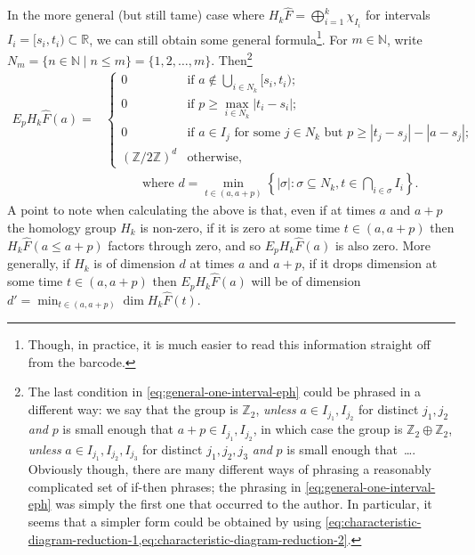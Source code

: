 \documentclass[12pt]{article}
\numberwithin{equation}{subsection}
\numberwithin{theorem}{subsection}
\numberwithin{lemma}{subsection}
\numberwithin{corollary}{subsection}
\numberwithin{definition}{subsection}
\numberwithin{example}{subsection}
\numberwithin{note}{subsection}
\newcommand{\zz}{\mathbb{Z}}
\newcommand{\rr}{\mathbb{R}}
\newcommand{\nn}{\mathbb{N}}
\begin{document}
            In the more general (but still tame) case where $H_k\widehat{F}=\bigoplus_{i=1}^k\chi_{I_i}$ for intervals $I_i=[s_i,t_i)\subset\rr$, we can still obtain some general formula\footnote{
                Though, in practice, it is much easier to read this information straight off from the barcode.
            }.
            For $m\in\nn$, write $N_m=\{n\in\nn \mid n\leqslant m\}=\{1,2,\ldots,m\}$.
            Then\footnote{
                The last condition in \cref{eq:general-one-interval-eph} could be phrased in a different way: we say that the group is $\zz_2$, \emph{unless} $a\in I_{j_1},I_{j_2}$ for distinct $j_1,j_2$ \emph{and} $p$ is small enough that $a+p\in I_{j_1},I_{j_2}$, in which case the group is $\zz_2\oplus\zz_2$, \emph{unless} $a\in I_{j_1},I_{j_2},I_{j_3}$ for distinct $j_1,j_2,j_3$ \emph{and} $p$ is small enough that~\ldots.
                Obviously though, there are many different ways of phrasing a reasonably complicated set of if-then phrases; the phrasing in \cref{eq:general-one-interval-eph} was simply the first one that occurred to the author.
                In particular, it seems that a simpler form could be obtained by using \cref{eq:characteristic-diagram-reduction-1,eq:characteristic-diagram-reduction-2}.
            }
            \begin{align}
                E_pH_k\widehat{F}(a)=
                &\begin{cases}
                    0 &\mbox{if }a\not\in\bigcup_{i\in N_k}[s_i,t_i);\\
                    0 &\mbox{if }p\geqslant\max_{i\in N_k}|t_i-s_i|;\\
                    0 &\mbox{if }a\in I_j\text{ for some }j\in N_k\text{ but }p\geqslant|t_j-s_j|-|a-s_j|;\\
                    (\zz/2\zz)^d &\mbox{otherwise,}
                \end{cases}\nonumber\\
                &\qquad\quad\text{where }d=\min_{t\in(a,a+p)}\left\{|\sigma| : \sigma\subseteq N_k, t\in\bigcap_{i\in\sigma}I_i\right\}.
            \end{align}
            A point to note when calculating the above is that, even if at times $a$ and $a+p$ the homology group $H_k$ is non-zero, if it is zero at some time $t\in(a,a+p)$ then $H_k\widehat{F}(a\leqslant a+p)$ factors through zero, and so $E_pH_k\widehat{F}(a)$ is also zero.
            More generally, if $H_k$ is of dimension $d$ at times $a$ and $a+p$, if it drops dimension at some time $t\in(a,a+p)$ then $E_pH_k\widehat{F}(a)$ will be of dimension $d'=\min_{t\in(a,a+p)}\dim H_k\widehat{F}(t)$.
\end{document}
